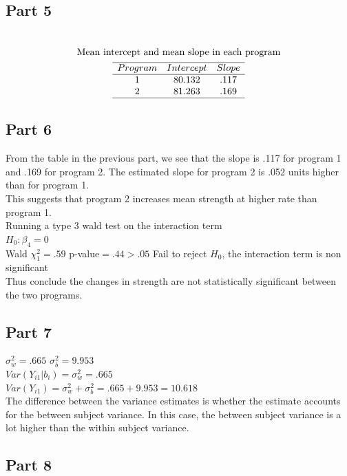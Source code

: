 \documentclass{article}
\newcommand{\sg}{\sigma}
\begin{document}
\begin{flushleft}
\subsection*{Part 5}
\begin{multline*}\\
\text{Mean intercept and  mean slope in each program}\\
\begin{array}{ccc}
\hline
Program &Intercept & Slope\\
\hline
1 & 80.132 & .117\\
2 & 81.263 & .169\\
\hline
\end{array}\\
\end{multline*}
\subsection*{Part 6}
From the table in the previous part, we see that the slope is .117 for program 1 and .169 for program 2. The estimated slope for program 2 is .052 units higher than for program 1.\\
This suggests that program 2 increases mean strength at higher rate than program 1.\\
Running a type 3 wald test on the interaction term\\
$H_0: \beta_4=0$\\
Wald $\chi^2_1=.59$ p-value$=.44>.05$ Fail to reject $H_0$, the interaction term is non significant\\
Thus conclude the changes in strength are not statistically significant between the two programs.
\subsection*{Part 7}
$\sg^2_w=.665$ \quad $\sg^2_b=9.953$\\
$Var(Y_{i1}|b_i)=\sg^2_w=.665$\\
$Var(Y_{i1})=\sg^2_w+\sg^2_b=.665+9.953=10.618$\\
The difference between the variance estimates is whether the estimate accounts for the between subject
variance. In this case, the between subject variance is a lot higher than the within subject variance.
\subsection*{Part 8}


\end{flushleft}
\end{document}
